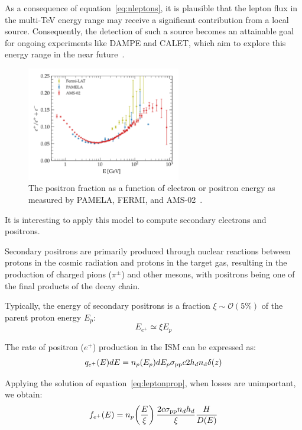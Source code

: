 As a consequence of equation~\eqref{eq:nleptons}, it is plausible that the lepton flux in the multi-TeV energy range may receive a significant contribution from a local source. Consequently, the detection of such a source becomes an attainable goal for ongoing experiments like DAMPE and CALET, which aim to explore this energy range in the near future~\cite{Evoli2021prdb}.

\begin{figure}[t]
\centering
\includegraphics[width=0.6\textwidth]{figures/positron_fraction.pdf}
\caption{The positron fraction as a function of electron or positron energy as measured by PAMELA, FERMI, and AMS-02~\cite{PAMELA.2009.posfraction,FERMI.2012.posfraction,AMS02.2013.posfraction}.}
\label{fig:positronfraction}
\end{figure}

It is interesting to apply this model to compute secondary electrons and positrons.

Secondary positrons are primarily produced through nuclear reactions between protons in the cosmic radiation and protons in the target gas, resulting in the production of charged pions ($\pi^\pm$) and other mesons, with positrons being one of the final products of the decay chain.

Typically, the energy of secondary positrons is a fraction $\xi \sim \mathcal{O}(5\%)$ of the parent proton energy $E_p$:
%
\begin{equation}
E_{e^+} \simeq \xi E_p 
\end{equation} 

The rate of positron ($e^+$) production in the ISM can be expressed as:
%
\begin{equation}
q_{e^+}(E) dE = n_p(E_p) dE_p \sigma_{\rm pp} c 2 h_d n_{\rm d} \delta(z) 
\label{eq:positronproduction}
\end{equation}

Applying the solution of equation~\eqref{eq:leptonprop}, when losses are unimportant, we obtain:
%
\begin{equation}
f_{e^+}(E) = 
n_p\!\left(\frac{E}{\xi} \right) \frac{2 c \sigma_{\rm pp} n_d h_d}{\xi}  \frac{H}{D(E)} 
\end{equation}

